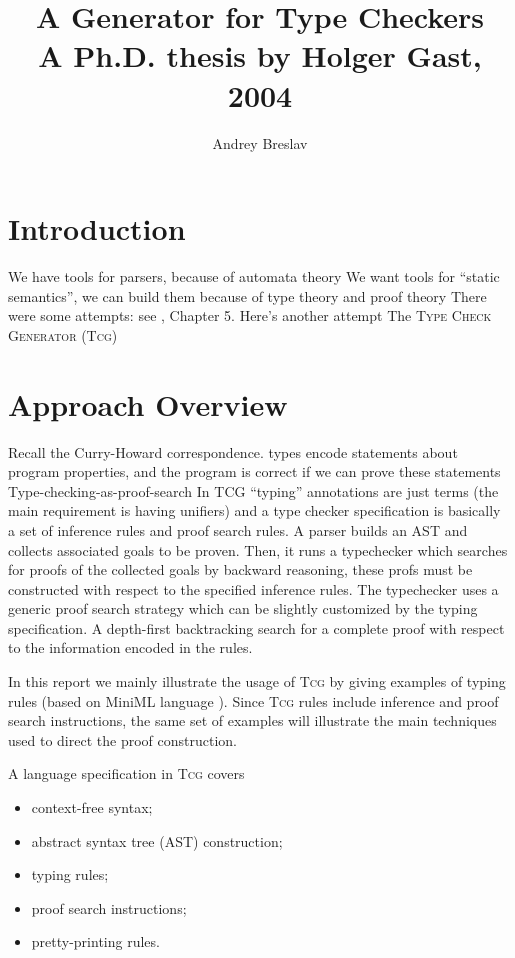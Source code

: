 \documentclass[a4paper,12pt]{article}
\title{A Generator for Type Checkers\\ \small{A Ph.D. thesis by Holger Gast, 2004}}
\author{Andrey Breslav}
\newcommand{\Tcg}{\textsc{Tcg}}
\begin{document}
\maketitle

\section{Introduction}

We have tools for parsers, because of automata theory
We want tools for ``static semantics'', we can build them because of type theory and proof theory
There were some attempts: see \cite{Tcg}, Chapter 5.
Here's another attempt The \textsc{Type Check Generator} (\Tcg{}) \cite{Tcg}

\section{Approach Overview}

 Recall the Curry-Howard correspondence.
 types encode statements about program properties, and the program is correct if we can prove these statements
 Type-checking-as-proof-search
 In TCG ``typing'' annotations are just terms (the main requirement is having unifiers) and a type checker specification
 is basically a set of inference rules and proof search rules.
 A parser builds an AST and collects associated goals to be proven. Then, it runs a typechecker which searches for proofs of the collected goals by backward reasoning, these profs must be constructed with respect to the specified inference rules. The typechecker uses a generic proof search strategy which can be slightly customized by the typing specification.
 A depth-first backtracking search for a complete proof with respect to the information encoded in the rules.

 In this report we mainly illustrate the usage of \Tcg{} by giving examples of typing rules (based on MiniML language \cite{MiniML}).
 Since \Tcg{} rules include inference and proof search instructions, the same set of examples will illustrate the main techniques used to direct the proof construction.

A language specification in \Tcg{} covers 
\begin{itemize}
	\item context-free syntax;
	\item abstract syntax tree (AST) construction;
	\item typing rules;
	\item proof search instructions;
	\item pretty-printing rules.
\end{itemize}
\end{document}
